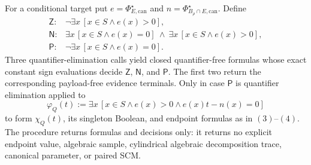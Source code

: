 For a conditional target put \(e=\Phi_{E,\mathrm{can}}^\star\) and \(n=\Phi_{B_\rho\cap E,\mathrm{can}}^\star\).  Define
\[
\begin{array}{ll}
\mathsf Z:&\neg\exists x\,[x\in S\wedge e(x)>0],\\
\mathsf N:&\exists x\,[x\in S\wedge e(x)=0]
\ \wedge\ \exists x\,[x\in S\wedge e(x)>0],\\
\mathsf P:&\neg\exists x\,[x\in S\wedge e(x)=0].
\end{array}
\tag{5}
\]
Three quantifier-elimination calls yield closed quantifier-free formulas whose exact constant sign evaluations decide \(\mathsf Z\), \(\mathsf N\), and \(\mathsf P\).  The first two return the corresponding payload-free evidence terminals.  Only in case \(\mathsf P\) is quantifier elimination applied to
\[
\varphi_Q(t):=\exists x\,[x\in S\wedge e(x)>0\wedge e(x)t-n(x)=0]
\tag{6}
\]
to form \(\chi_Q(t)\), its singleton Boolean, and endpoint formulas as in \((3)\)--\((4)\).  The procedure returns formulas and decisions only: it returns no explicit endpoint value, algebraic sample, cylindrical algebraic decomposition trace, canonical parameter, or paired SCM.